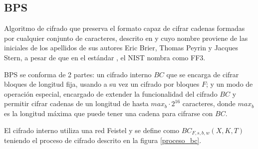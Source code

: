 %
%

\subsection{BPS}


Algoritmo de cifrado que preserva el formato capaz de cifrar cadenas formadas
por cualquier conjunto de caracteres, descrito en \cite{bps} y cuyo nombre
proviene de las iniciales de los apellidos de sus autores Eric Brier, Thomas
Peyrin y Jacques Stern, a pesar de que en el estándar \cite{nist_fpe}, el NIST
nombra como FF3.

BPS se conforma de 2 partes: un cifrado interno $BC$ que se encarga de cifrar
bloques de longitud fija, usando a su vez un cifrado por bloques $F$; y un modo
de operación especial, encargado de extender la funcionalidad del cifrado $BC$
y permitir cifrar cadenas de un longitud de hasta $max_b \cdot 2^{16}$
caracteres, donde $max_b$ es la longitud máxima que puede tener una cadena
para cifrarse con $BC$.

El cifrado interno utiliza una red Feistel y se define como $BC_{F,s,b,w}
(X,K,T)$ teniendo el proceso de cifrado descrito en la figura \ref{proceso_bc}.

